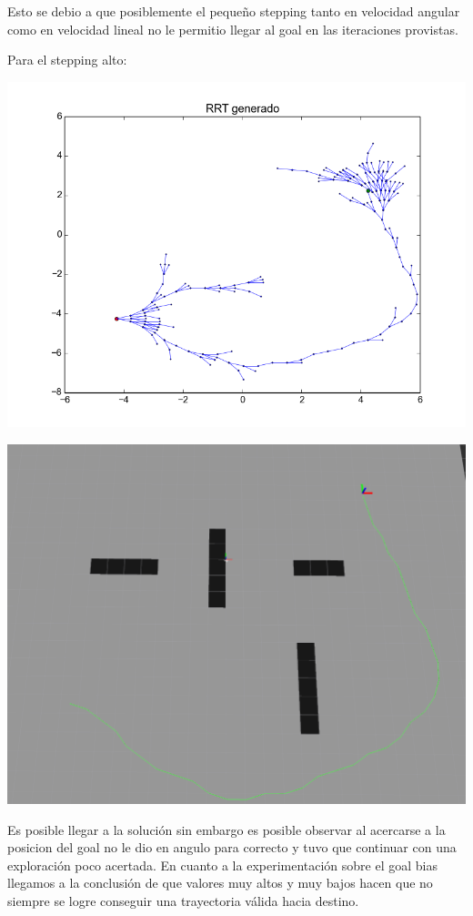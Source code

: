 Esto se debio a que posiblemente el pequeño stepping tanto en velocidad angular como en velocidad lineal no le permitio llegar al goal en las iteraciones provistas.

Para el stepping alto:

\includegraphics[scale=0.5]{velocidad/stepping_alto2.png}

\includegraphics[scale=0.5]{velocidad/stepping_alto_rviz2.png}

Es posible llegar a la solución sin embargo es posible observar al acercarse a la posicion del goal no le dio en angulo para correcto y tuvo que continuar con una exploración poco acertada.
%
%
%
En cuanto a la experimentación sobre el goal bias llegamos a la conclusión de que valores muy altos y muy bajos hacen que no siempre se logre conseguir una trayectoria válida hacia destino.


